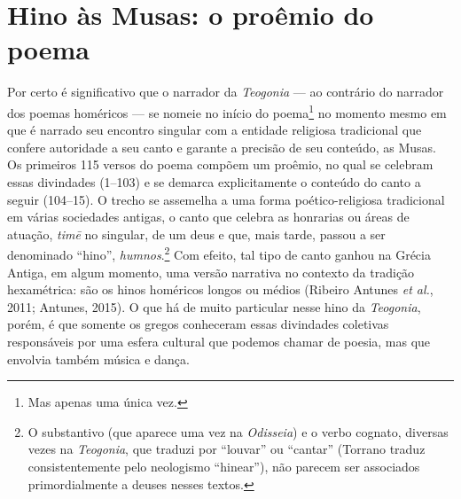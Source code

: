 
\section{Hino às Musas: o proêmio do poema}

Por certo é significativo que o narrador da \textit{Teogonia} --- ao
contrário do narrador dos poemas homéricos --- se nomeie no início do
poema\footnote{Mas apenas uma única vez.} no momento mesmo em que é narrado seu
encontro singular com a entidade religiosa tradicional que confere
autoridade a seu canto e garante a precisão de seu conteúdo, as Musas.
Os primeiros 115 versos do poema compõem um proêmio, no qual se celebram
essas divindades (1--103) e se demarca explicitamente o conteúdo do canto
a seguir (104--15). O trecho se assemelha a uma forma poético-religiosa
tradicional em várias sociedades antigas, o canto que celebra as
honrarias ou áreas de atuação, \textit{timē} no singular, de um deus e
que, mais tarde, passou a ser denominado ``hino'', \textit{humnos}.\footnote{O substantivo (que aparece uma vez na
  \textit{Odisseia}) e o verbo cognato, diversas vezes na
  \textit{Teogonia}, que traduzi por ``louvar'' ou ``cantar''
  (Torrano traduz consistentemente pelo neologismo ``hinear''), não
  parecem ser associados primordialmente a deuses nesses textos.} Com
efeito, tal tipo de canto ganhou na Grécia Antiga, em algum momento, uma
versão narrativa no contexto da tradição hexamétrica: são os hinos
homéricos longos ou médios (Ribeiro Antunes \textit{et al.}, 2011; Antunes,
2015). O que há de muito particular nesse hino da \textit{Teogonia},
porém, é que somente os gregos conheceram essas divindades coletivas
responsáveis por uma esfera cultural que podemos chamar de poesia, mas
que envolvia também música e dança.

